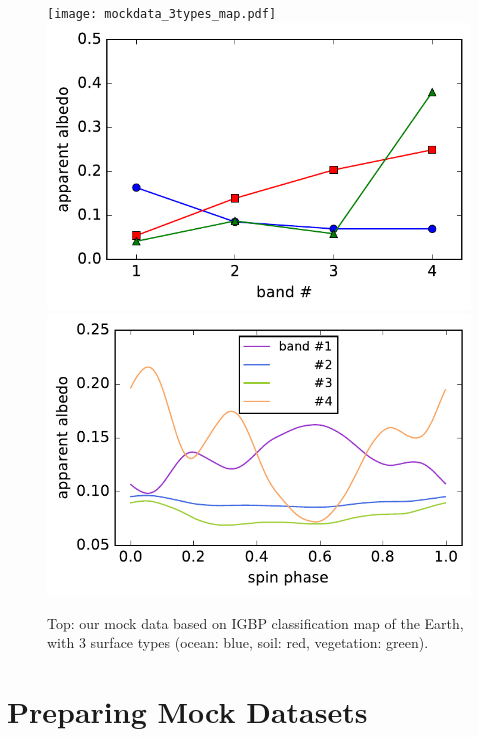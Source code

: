 \documentclass[iop,numberedappendix,apj,]{emulateapj}
\begin{document}
\begin{figure}[t]
    \begin{center}
	\texttt{[image: mockdata\_3types\_map.pdf]}
    \includegraphics[width=\hsize]{mockdata_3types_albd.pdf}
	\includegraphics[width=\hsize]{mockdata_90deg_3types_t360_lc.pdf}
    \end{center}
    \caption{Top: our mock data based on IGBP classification map of the Earth, with 3 surface types (ocean: blue, soil: red, vegetation: green). }
\label{fig:mockdata}
\end{figure}


\section{Preparing Mock Datasets}
\label{s:mockdata}
\end{document}
